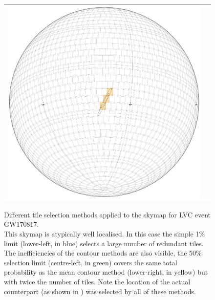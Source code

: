 \begin{colsection}
\begin{colsection}
\begin{figure}[p]
\begin{center}
\begin{tabular}{cc}
            \includegraphics[width=0.25\linewidth]{images/tiling/2_b.png} \\
        \end{tabular}
    \end{center}
    \caption[Different tile selection methods for GW170817]{
        Different tile selection methods applied to the skymap for LVC event GW170817.\\
        This skymap is atypically well localised. In this case the simple 1\% limit (lower-left, in blue) selects a large number of redundant tiles. The inefficiencies of the contour methods are also visible, the 50\% selection limit (centre-left, in green) covers the same total probability as the mean contour method (lower-right, in yellow) but with twice the number of tiles. Note the location of the actual counterpart (as shown in ) was selected by all of these methods.
    }\label{fig:tiling_GW170817}
\end{figure}

\newpage


\end{colsection}
\end{colsection}
